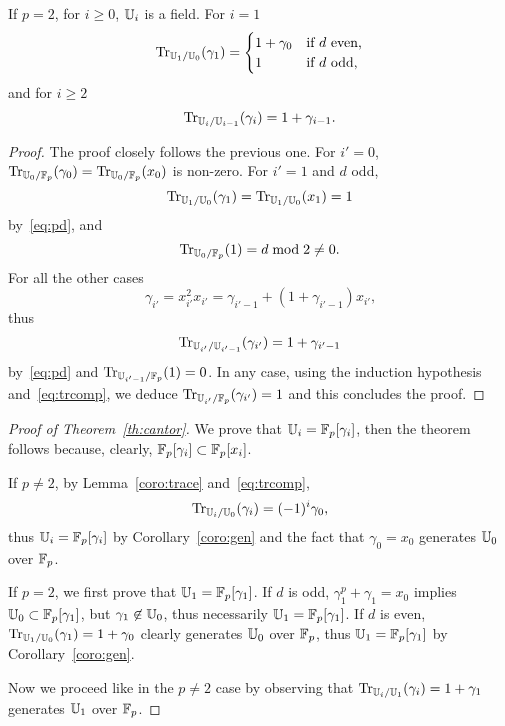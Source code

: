 \begin{lemma}
  If $p=2$, for $i \ge 0$, $\mathbb{U}_i$ is a field. For $i=1$
  \begin{equation}
    \operatorname{Tr}_{\mathbb{U}_1/\mathbb{U}_0}(\gamma_1) = \begin{cases}
      1+\gamma_0 &\text{if $d$ even,}\\
      1          &\text{if $d$ odd,}
    \end{cases}
  \end{equation}
  and for $i\ge2$
  \begin{equation}
    \operatorname{Tr}_{\mathbb{U}_i/\mathbb{U}_{i-1}}(\gamma_i) = 1+\gamma_{i-1}
    \text{.}
  \end{equation}
\end{lemma}
\begin{proof}
  The proof closely follows the previous one. For $i'=0$,
  $\operatorname{Tr}_{\mathbb{U}_0/\mathbb{F}_p}(\gamma_0)=\operatorname{Tr}_{\mathbb{U}_0/\mathbb{F}_p}(x_0)$ is non-zero.  For
  $i'=1$ and $d$ odd, 
  \begin{equation}
    \label{eq:66}
    \operatorname{Tr}_{\mathbb{U}_1/\mathbb{U}_0}(\gamma_1)=\operatorname{Tr}_{\mathbb{U}_1/\mathbb{U}_0}(x_1)  = 1    
  \end{equation}
  by~\ref{eq:pd}, and
  \begin{equation}
    \label{eq:67}
    \operatorname{Tr}_{\mathbb{U}_0/\mathbb{F}_p}(1) = d\bmod 2\ne0
    \text{.}
  \end{equation}
  For all the other cases 
  \begin{equation}
    \label{eq:68}
    \gamma_{i'}=x_{i'}^2x_{i'}=\gamma_{i'-1} +
    (1+\gamma_{i'-1})x_{i'}\text{,}    
  \end{equation}
  thus
  \begin{equation}
    \operatorname{Tr}_{\mathbb{U}_{i'}/\mathbb{U}_{i'-1}}(\gamma_{i'})=1+\gamma_{i'-1}    
  \end{equation}
  by~\ref{eq:pd} and $\operatorname{Tr}_{\mathbb{U}_{i'-1}/\mathbb{F}_p}(1) = 0$. In any case, using
  the induction hypothesis and~\ref{eq:trcomp}, we deduce
  $\operatorname{Tr}_{\mathbb{U}_{i'}/\mathbb{F}_p}(\gamma_{i'}) = 1$ and this concludes the proof.
\end{proof}


\begin{proof}[Proof of Theorem~\ref{th:cantor}]
  We prove that $\mathbb{U}_i=\mathbb{F}_p[\gamma_i]$, then the theorem follows
  because, clearly, $\mathbb{F}_p[\gamma_i]\subset\mathbb{F}_p[x_i]$.

  If $p\ne2$, by Lemma~\ref{coro:trace} and~\ref{eq:trcomp},
  \begin{equation}
    \label{eq:69}
    \operatorname{Tr}_{\mathbb{U}_i/\mathbb{U}_0}(\gamma_i) = (-1)^i\gamma_0
    \text{,}    
  \end{equation}
  thus $\mathbb{U}_i=\mathbb{F}_p[\gamma_i]$ by Corollary~\ref{coro:gen} and the fact
  that $\gamma_0 = x_0$ generates $\mathbb{U}_0$ over $\mathbb{F}_p$.

  If $p=2$, we first prove that $\mathbb{U}_1=\mathbb{F}_p[\gamma_1]$.  If $d$ is odd,
  $\gamma_1^p + \gamma_1 = x_0$ implies $\mathbb{U}_0\subset\mathbb{F}_p[\gamma_1]$,
  but $\gamma_1\not\in\mathbb{U}_0$, thus necessarily $\mathbb{U}_1=\mathbb{F}_p[\gamma_1]$.
  If $d$ is even, $\operatorname{Tr}_{\mathbb{U}_1/\mathbb{U}_0}(\gamma_1)=1+\gamma_0$ clearly
  generates $\mathbb{U}_0$ over $\mathbb{F}_p$, thus $\mathbb{U}_1=\mathbb{F}_p[\gamma_1]$ by
  Corollary~\ref{coro:gen}.
  
  Now we proceed like in the $p\ne2$ case by observing that
  $\operatorname{Tr}_{\mathbb{U}_i/\mathbb{U}_1}(\gamma_i)=1+\gamma_1$ generates $\mathbb{U}_1$ over $\mathbb{F}_p$.
\end{proof}

